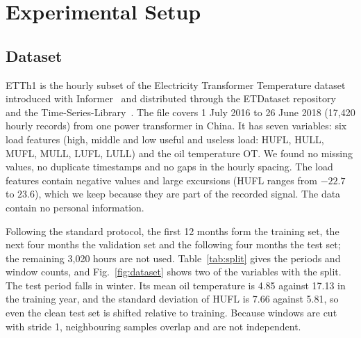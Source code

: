 \section{Experimental Setup}
\label{sec:exp}

\subsection{Dataset}

ETTh1 is the hourly subset of the Electricity Transformer Temperature dataset introduced with Informer~\cite{informer} and distributed through the ETDataset repository~\cite{ettdata} and the Time-Series-Library~\cite{tslib_code}. The file covers 1 July 2016 to 26 June 2018 (17,420 hourly records) from one power transformer in China. It has seven variables: six load features (high, middle and low useful and useless load: HUFL, HULL, MUFL, MULL, LUFL, LULL) and the oil temperature OT. We found no missing values, no duplicate timestamps and no gaps in the hourly spacing. The load features contain negative values and large excursions (HUFL ranges from $-22.7$ to $23.6$), which we keep because they are part of the recorded signal. The data contain no personal information.

Following the standard protocol, the first 12 months form the training set, the next four months the validation set and the following four months the test set; the remaining 3,020 hours are not used. Table~\ref{tab:split} gives the periods and window counts, and Fig.~\ref{fig:dataset} shows two of the variables with the split. The test period falls in winter. Its mean oil temperature is 4.85 against 17.13 in the training year, and the standard deviation of HUFL is 7.66 against 5.81, so even the clean test set is shifted relative to training. Because windows are cut with stride 1, neighbouring samples overlap and are not independent.

\begin{table}[!t]
\centering
\caption{Chronological Split of ETTh1}
\label{tab:split}
\footnotesize
{}
\end{table}

